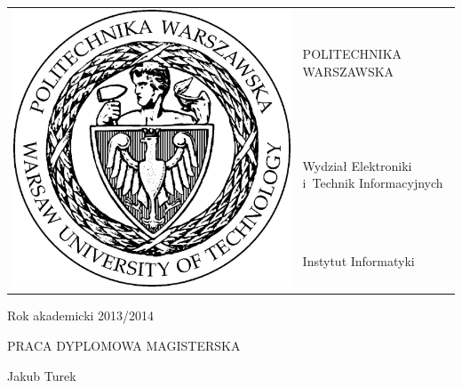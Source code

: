 
\begin{titlepage}

 \begin{tabular}{ll}
  \multirow{3}{*}{\includegraphics[scale=0.3]{figures/pw.jpg}} & POLITECHNIKA WARSZAWSKA                      \\
                                                               & Wydział Elektroniki i~Technik Informacyjnych \\
                                                               & Instytut Informatyki
 \end{tabular}
 
 \begin{flushright}
  Rok akademicki 2013/2014
 \end{flushright}

 \vspace{1.5cm}
 
 \begin{center}
  \LARGE PRACA DYPLOMOWA MAGISTERSKA
  
  \vspace{1.5cm}
  
  \large Jakub Turek
  
  \vspace{1.5cm}
  

\end{center}
\end{titlepage}
